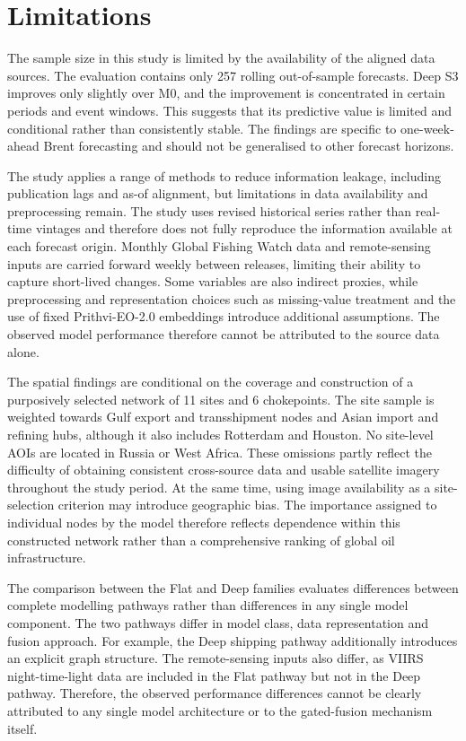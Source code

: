 \documentclass[
  british,
  12pt,
  oneside]{book}
\begin{document}
\section{Limitations}\label{discussion-limitations}

The sample size in this study is limited by the availability of the aligned data sources. The evaluation contains only 257 rolling out-of-sample forecasts. Deep S3 improves only slightly over M0, and the improvement is concentrated in certain periods and event windows. This suggests that its predictive value is limited and conditional rather than consistently stable. The findings are specific to one-week-ahead Brent forecasting and should not be generalised to other forecast horizons.

The study applies a range of methods to reduce information leakage, including publication lags and as-of alignment, but limitations in data availability and preprocessing remain. The study uses revised historical series rather than real-time vintages and therefore does not fully reproduce the information available at each forecast origin. Monthly Global Fishing Watch data and remote-sensing inputs are carried forward weekly between releases, limiting their ability to capture short-lived changes. Some variables are also indirect proxies, while preprocessing and representation choices such as missing-value treatment and the use of fixed Prithvi-EO-2.0 embeddings introduce additional assumptions. The observed model performance therefore cannot be attributed to the source data alone.

The spatial findings are conditional on the coverage and construction of a purposively selected network of 11 sites and 6 chokepoints. The site sample is weighted towards Gulf export and transshipment nodes and Asian import and refining hubs, although it also includes Rotterdam and Houston. No site-level AOIs are located in Russia or West Africa. These omissions partly reflect the difficulty of obtaining consistent cross-source data and usable satellite imagery throughout the study period. At the same time, using image availability as a site-selection criterion may introduce geographic bias. The importance assigned to individual nodes by the model therefore reflects dependence within this constructed network rather than a comprehensive ranking of global oil infrastructure.

The comparison between the Flat and Deep families evaluates differences between complete modelling pathways rather than differences in any single model component. The two pathways differ in model class, data representation and fusion approach. For example, the Deep shipping pathway additionally introduces an explicit graph structure. The remote-sensing inputs also differ, as VIIRS night-time-light data are included in the Flat pathway but not in the Deep pathway. Therefore, the observed performance differences cannot be clearly attributed to any single model architecture or to the gated-fusion mechanism itself.
\end{document}
